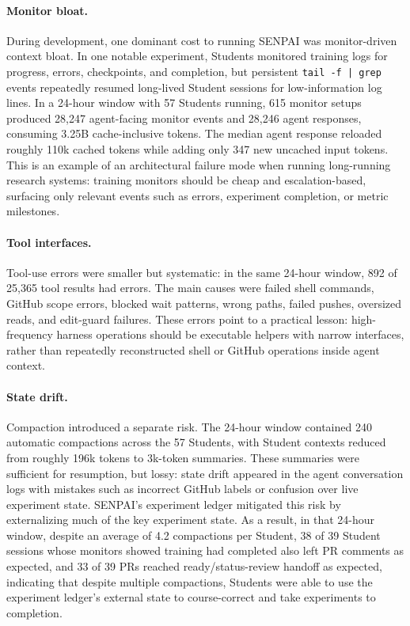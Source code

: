 \documentclass{article}
\begin{document}
\paragraph{Monitor bloat.}
During development, one dominant cost to running SENPAI was monitor-driven context bloat. In one notable experiment, Students monitored training logs for progress, errors, checkpoints, and completion, but persistent \texttt{tail -f | grep} events repeatedly resumed long-lived Student sessions for low-information log lines. In a 24-hour window with 57 Students running, 615 monitor setups produced 28,247 agent-facing monitor events and 28,246 agent responses, consuming 3.25B cache-inclusive tokens. The median agent response reloaded roughly 110k cached tokens while adding only 347 new uncached input tokens. This is an example of an architectural failure mode when running long-running research systems: training monitors should be cheap and escalation-based, surfacing only relevant events such as errors, experiment completion, or metric milestones.

\paragraph{Tool interfaces.}
Tool-use errors were smaller but systematic: in the same 24-hour window, 892 of 25,365 tool results had errors. The main causes were failed shell commands, GitHub scope errors, blocked wait patterns, wrong paths, failed pushes, oversized reads, and edit-guard failures. These errors point to a practical lesson: high-frequency harness operations should be executable helpers with narrow interfaces, rather than repeatedly reconstructed shell or GitHub operations inside agent context.

\paragraph{State drift.}
Compaction introduced a separate risk. The 24-hour window contained 240 automatic compactions across the 57 Students, with Student contexts reduced from roughly 196k tokens to 3k-token summaries. These summaries were sufficient for resumption, but lossy: state drift appeared in the agent conversation logs with mistakes such as incorrect GitHub labels or confusion over live experiment state. SENPAI's experiment ledger mitigated this risk by externalizing much of the key experiment state. As a result, in that 24-hour window, despite an average of 4.2 compactions per Student, 38 of 39 Student sessions whose monitors showed training had completed also left PR comments as expected, and 33 of 39 PRs reached ready/status-review handoff as expected, indicating that despite multiple compactions, Students were able to use the experiment ledger's external state to course-correct and take experiments to completion.
\end{document}

